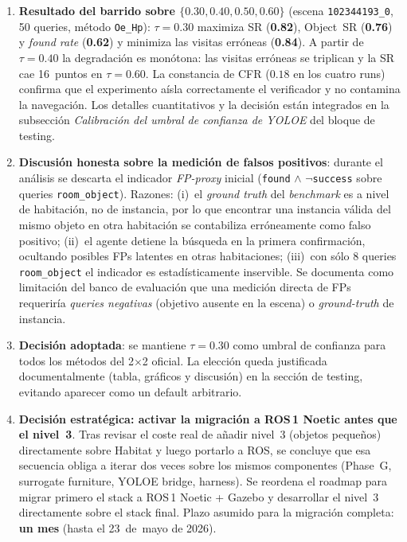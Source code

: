 \begin{enumerate}
  \item \textbf{Resultado del barrido sobre $\{0.30, 0.40, 0.50, 0.60\}$}
        (escena \texttt{102344193\_0}, 50 queries, método \texttt{Oe\_Hp}):
        $\tau=0.30$ maximiza SR (\textbf{0.82}), Object~SR (\textbf{0.76}) y
        \emph{found rate} (\textbf{0.62}) y minimiza las visitas erróneas
        (\textbf{0.84}). A partir de $\tau=0.40$ la degradación es monótona:
        las visitas erróneas se triplican y la SR cae 16~puntos en $\tau=0.60$.
        La constancia de CFR ($0.18$ en los cuatro runs) confirma que el
        experimento aísla correctamente el verificador y no contamina la
        navegación. Los detalles cuantitativos y la decisión están integrados
        en la subsección \emph{Calibración del umbral de confianza de YOLOE}
        del bloque de testing.

  \item \textbf{Discusión honesta sobre la medición de falsos positivos}:
        durante el análisis se descarta el indicador \emph{FP-proxy} inicial
        (\texttt{found} $\land$ $\neg$\texttt{success} sobre queries
        \texttt{room\_object}). Razones: (i)~el \emph{ground truth} del
        \emph{benchmark} es a nivel de habitación, no de instancia, por lo que
        encontrar una instancia válida del mismo objeto en otra habitación se
        contabiliza erróneamente como falso positivo; (ii)~el agente detiene la
        búsqueda en la primera confirmación, ocultando posibles FPs latentes en
        otras habitaciones; (iii)~con sólo 8 queries \texttt{room\_object} el
        indicador es estadísticamente inservible. Se documenta como limitación
        del banco de evaluación que una medición directa de FPs requeriría
        \emph{queries negativas} (objetivo ausente en la escena) o
        \emph{ground-truth} de instancia.

  \item \textbf{Decisión adoptada}: se mantiene $\tau=0.30$ como umbral de
        confianza para todos los métodos del 2$\times$2 oficial. La elección
        queda justificada documentalmente (tabla, gráficos y discusión) en la
        sección de testing, evitando aparecer como un default arbitrario.

  \item \textbf{Decisión estratégica: activar la migración a ROS\,1 Noetic
        antes que el nivel~3}. Tras revisar el coste real de añadir nivel~3
        (objetos pequeños) directamente sobre Habitat y luego portarlo a ROS,
        se concluye que esa secuencia obliga a iterar dos veces sobre los
        mismos componentes (Phase~G, surrogate furniture, YOLOE bridge,
        harness). Se reordena el roadmap para migrar primero el stack a
        ROS\,1 Noetic + Gazebo y desarrollar el nivel~3 directamente sobre el
        stack final. Plazo asumido para la migración completa: \textbf{un mes}
        (hasta el 23~de~mayo de 2026).


\end{enumerate}
